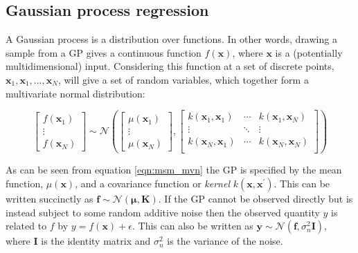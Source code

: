 \subsection{Gaussian process regression}\label{subsec:gp}

A Gaussian process is a distribution over functions\cite{rasmussenGaussianProcessesMachine2006}.  In other words, drawing a sample from a GP gives a continuous function $f(\mathbf{x})$, where $\mathbf{x}$ is a (potentially multidimensional) input. Considering this function at a set of discrete points, $\mathbf{x}_{1}, \mathbf{x}_{1},\ldots, \mathbf{x}_{N}$, will give a set of random variables, which together form a multivariate normal distribution: 

\begin{equation}
\begin{bmatrix}  f\left(\mathbf{x}_{1}\right) \\ \vdots \\ f\left(\mathbf{x}_{N}\right) \end{bmatrix} 
\sim 
\mathcal{N}\left( 
\begin{bmatrix} \mu\left(\mathbf{x}_{1}\right) \\  \vdots \\ \mu\left(\mathbf{x}_{N}\right) \end{bmatrix}, 
\begin{bmatrix}
k(\mathbf{x}_{1}, \mathbf{x}_{1}) & \cdots & k(\mathbf{x}_{1}, \mathbf{x}_{N}) \\
\vdots & \ddots & \vdots \\
k(\mathbf{x}_{N}, \mathbf{x}_{1}) & \cdots & k(\mathbf{x}_{N}, \mathbf{x}_{N}) \\
\end{bmatrix}
\right)
\end{equation}\label{eqn:msm_mvn}

As can be seen from equation \ref{eqn:msm_mvn} the GP is specified by the mean function, $\mu(\mathbf{x})$, and a covariance function or \emph{kernel} $k(\mathbf{x}, \mathbf{x}^{\prime})$. This can be written succinctly as $\mathbf{f} \sim \mathcal{N}(\bm{\mu}, \mathbf{K})$\cite{rasmussenGaussianProcessesMachine2006}. If the GP cannot be observed directly but is instead subject to some random additive noise then the observed quantity $y$ is related to $f$ by $y = f(\mathbf{x}) + \epsilon$. This can also be written as $\mathbf{y} \sim \mathcal{N}(\mathbf{f}, \sigma_{n}^{2}\mathbf{I})$, where $\mathbf{I}$ is the identity matrix and $\sigma_{n}^{2}$ is the variance of the noise\cite{rasmussenGaussianProcessesMachine2006}.

